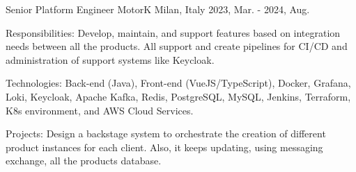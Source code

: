 

\begin{cventries}
  \cventry
    {Senior Platform Engineer} %
    {MotorK} %
    {Milan, Italy} %
    {2023, Mar. - 2024, Aug.} %
    {
          \begin{cvitems} %
            \item {Responsibilities: Develop, maintain, and support features based on integration needs between all the products. All support and create pipelines for CI/CD and administration of support systems like Keycloak.}
            \item {Technologies: Back-end (Java), Front-end (VueJS/TypeScript), Docker, Grafana, Loki, Keycloak, Apache Kafka, Redis, PostgreSQL, MySQL, Jenkins, Terraform, K8s environment, and AWS Cloud Services.}
            \item {Projects: Design a backstage system to orchestrate the creation of different product instances for each client. Also, it keeps updating, using messaging exchange, all the products database.}
          \end{cvitems}
    }


\end{cventries}
